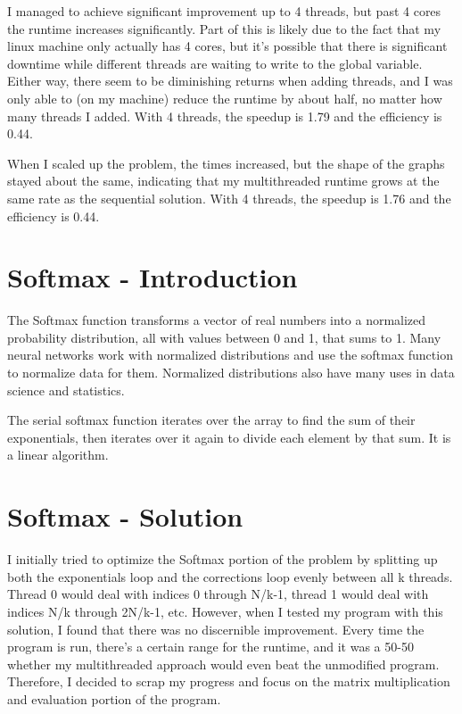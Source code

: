 \documentclass[a4paper]{article}
\begin{document}
I managed to achieve significant improvement up to 4 threads, but past 4 cores the runtime increases significantly. Part of this is likely due to the fact that my linux machine only actually has 4 cores, but it's possible that there is significant downtime while different threads are waiting to write to the global variable. Either way, there seem to be diminishing returns when adding threads, and I was only able to (on my machine) reduce the runtime by about half, no matter how many threads I added. With 4 threads, the speedup is 1.79 and the efficiency is 0.44.

When I scaled up the problem, the times increased, but the shape of the graphs stayed about the same, indicating that my multithreaded runtime grows at the same rate as the sequential solution. With 4 threads, the speedup is 1.76 and the efficiency is 0.44.


\section{Softmax - Introduction}

The Softmax function transforms a vector of real numbers into a normalized probability distribution, all with values between 0 and 1, that sums to 1. Many neural networks work with normalized distributions and use the softmax function to normalize data for them. Normalized distributions also have many uses in data science and statistics.

The serial softmax function iterates over the array to find the sum of their exponentials, then iterates over it again to divide each element by that sum. It is a linear algorithm.


\section{Softmax - Solution}

I initially tried to optimize the Softmax portion of the problem by splitting up both the exponentials loop and the corrections loop evenly between all k threads. Thread 0 would deal with indices 0 through N/k-1, thread 1 would deal with indices N/k through 2N/k-1, etc. However, when I tested my program with this solution, I found that there was no discernible improvement. Every time the program is run, there's a certain range for the runtime, and it was a 50-50 whether my multithreaded approach would even beat the unmodified program. Therefore, I decided to scrap my progress and focus on the matrix multiplication and evaluation portion of the program.
\end{document}
